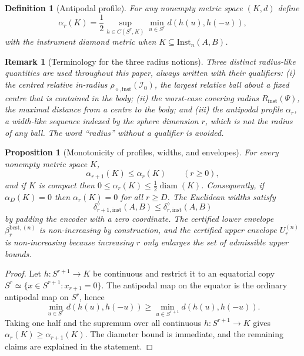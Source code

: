 \documentclass[11pt,a4paper]{article}
\newtheorem{proposition}[theorem]{Proposition}
\newtheorem{definition}[theorem]{Definition}
\newtheorem{remark}[theorem]{Remark}
\newcommand{\Inst}{\mathrm{Inst}}
\newcommand{\diam}{\operatorname{diam}}
\begin{document}
\begin{definition}[Antipodal profile]
\label{def:alpha}
For any nonempty metric space $(K,d)$ define
\[
\alpha_r(K)=\frac12\sup_{h\in C(S^r,K)}\min_{u\in S^r}d(h(u),h(-u)),
\]
with the instrument diamond metric when $K\subseteq\Inst_n(A,B)$.
\end{definition}

\begin{remark}[Terminology for the three radius notions]
\label{rem:radius-terminology}
Three distinct radius-like quantities are used throughout this paper, always written with their qualifiers: (i) the \emph{centred relative in-radius} $\rho_{\diamond,\mathrm{inst}}(\mathcal I_0)$, the largest relative ball about a fixed centre that is contained in the body; (ii) the \emph{worst-case covering radius} $R_{\mathrm{inst}}(\Psi)$, the maximal distance from a centre to the body; and (iii) the \emph{antipodal profile} $\alpha_r$, a width-like sequence indexed by the sphere dimension $r$, which is not the radius of any ball. The word ``radius'' without a qualifier is avoided.
\end{remark}

\begin{proposition}[Monotonicity of profiles, widths, and envelopes]
\label{prop:monotonicity}
For every nonempty metric space $K$,
\[
\alpha_{r+1}(K)\le\alpha_r(K)\qquad(r\ge0),
\]
and if $K$ is compact then $0\le\alpha_r(K)\le\tfrac12\diam(K)$. Consequently, if $\alpha_D(K)=0$ then $\alpha_r(K)=0$ for all $r\ge D$. The Euclidean widths satisfy
\[
\delta_{r+1,\mathrm{inst}}^{\diamond}(A,B)\le\delta_{r,\mathrm{inst}}^{\diamond}(A,B)
\]
by padding the encoder with a zero coordinate. The certified lower envelope $\beta_r^{\mathrm{best},(n)}$ is non-increasing by construction, and the certified upper envelope $U_r^{(n)}$ is non-increasing because increasing $r$ only enlarges the set of admissible upper bounds.
\end{proposition}

\begin{proof}
Let $h:S^{r+1}\to K$ be continuous and restrict it to an equatorial copy $S^r\simeq\{x\in S^{r+1}:x_{r+1}=0\}$. The antipodal map on the equator is the ordinary antipodal map on $S^r$, hence
\[
\min_{u\in S^r}d(h(u),h(-u))
\ge\min_{u\in S^{r+1}}d(h(u),h(-u)).
\]
Taking one half and the supremum over all continuous $h:S^{r+1}\to K$ gives $\alpha_r(K)\ge\alpha_{r+1}(K)$. The diameter bound is immediate, and the remaining claims are explained in the statement.
\end{proof}
\end{document}
